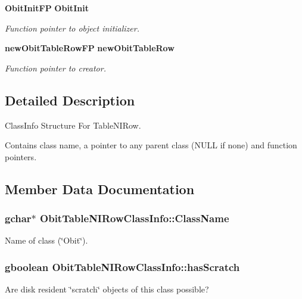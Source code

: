 \begin{CompactItemize}
{\bf Obit\-Init\-FP} {\bf Obit\-Init}
\begin{CompactList}\small\item\em Function pointer to object initializer. \item\end{CompactList}\item 
{\bf new\-Obit\-Table\-Row\-FP} {\bf new\-Obit\-Table\-Row}
\begin{CompactList}\small\item\em Function pointer to creator. \item\end{CompactList}\end{CompactItemize}


\subsection{Detailed Description}
Class\-Info Structure For Table\-NIRow. 

Contains class name, a pointer to any parent class (NULL if none) and function pointers. 



\subsection{Member Data Documentation}
\subsubsection{\setlength{\rightskip}{0pt plus 5cm}gchar$\ast$ {\bf Obit\-Table\-NIRow\-Class\-Info::Class\-Name}}\label{structObitTableNIRowClassInfo_o2}


Name of class (\char`\"{}Obit\char`\"{}). 

\subsubsection{\setlength{\rightskip}{0pt plus 5cm}gboolean {\bf Obit\-Table\-NIRow\-Class\-Info::has\-Scratch}}\label{structObitTableNIRowClassInfo_o1}


Are disk resident \char`\"{}scratch\char`\"{} objects of this class possible? 


